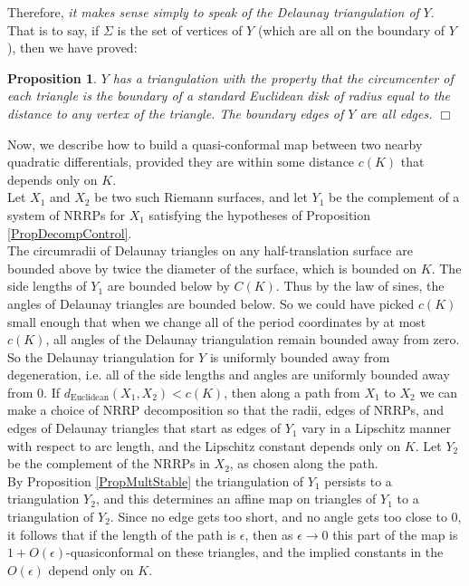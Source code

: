 \documentclass[12pt]{article}
\newtheorem{proposition}[theorem]{Proposition}
\begin{document}
\noindent Therefore, \emph{it makes sense simply to speak of the Delaunay triangulation of} $Y$. That is to say, if $\Sigma$ is the set of vertices of $Y$ (which are all on the boundary of $Y$), then we have proved:

\begin{proposition} $Y$ has a triangulation with the property that the circumcenter of each triangle is the boundary of a standard Euclidean disk of radius equal to the distance to any vertex of the triangle. The boundary edges of $Y$ are all edges. $\Box$ \end{proposition}

\noindent Now, we describe how to build a quasi-conformal map between two nearby quadratic differentials, provided they are within some distance $c(K)$ that depends only on $K$.\\

\noindent Let $X_1$ and $X_2$ be two such Riemann surfaces, and let $Y_1$ be the complement of a system of NRRPs for $X_1$ satisfying the hypotheses of Proposition \ref{PropDecompControl}.\\

\noindent The circumradii of Delaunay triangles on any half-translation surface are bounded above by twice the diameter of the surface, which is bounded on $K$. The side lengths of $Y_1$ are bounded below by $C(K)$. Thus by the law of sines, the angles of Delaunay triangles are bounded below. So we could have picked $c(K)$ small enough that when we change all of the period coordinates by at most $c(K)$, all angles of the Delaunay triangulation remain bounded away from zero. So the Delaunay triangulation for $Y$ is uniformly bounded away from degeneration, i.e. all of the side lengths and angles are uniformly bounded away from $0$. If $d_\mathrm{Euclidean}(X_1,X_2) < c(K)$, then along a path from $X_1$ to $X_2$ we can make a choice of NRRP decomposition so that the radii, edges of NRRPs, and edges of Delaunay triangles that start as edges of $Y_1$ vary in a Lipschitz manner with respect to arc length, and the Lipschitz constant depends only on $K$. Let $Y_2$ be the complement of the NRRPs in $X_2$, as chosen along the path.\\

\noindent By Proposition \ref{PropMultStable} the triangulation of $Y_1$ persists to a triangulation $Y_2$, and this determines an affine map on triangles of $Y_1$ to a triangulation of $Y_2$. Since no edge gets too short, and no angle gets too close to $0$, it follows that if the length of the path is $\epsilon$, then as $\epsilon \to 0$ this part of the map is $1 + O(\epsilon)$-quasiconformal on these triangles, and the implied constants in the $O(\epsilon)$ depend only on $K$.
\end{document}
